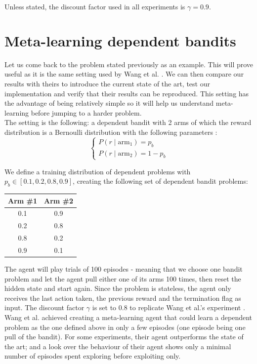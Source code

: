 Unless stated, the discount factor used in all experiments is $\gamma=0.9$. 


\section{Meta-learning dependent bandits}
Let us come back to the problem stated previously as an example. This will
prove useful as it is the same setting used by Wang et al. \cite{learningtorl}.
We can then compare our results with theirs to introduce the current state
of the art, test our implementation and verify that their results can 
be reproduced. This setting has the advantage of being relatively simple
so it will help us understand meta-learning before jumping to a harder problem.\\

The setting is the following: a dependent
bandit with 2 arms of which the reward distribution is a Bernoulli distribution
with the following parameters : 
$$ \begin{cases} P(r \mid \text{arm}_1) = p_b \\ 
P(r \mid \text{arm}_2) = 1 - p_b  \end{cases} $$

We define a training distribution of dependent problems with
$p_b \in [0.1, 0.2, 0.8, 0.9]$, creating the following set of dependent
bandit problems:
\begin{table}[H]
	\centering
	\begin{tabular}{c|c}
		Arm \#1 & Arm \#2 \\ \hline
		0.1 & 0.9 \\ \hline
		0.2 & 0.8 \\ \hline
		0.8 & 0.2 \\ \hline
		0.9 & 0.1
	\end{tabular}
\end{table}

The agent will play trials of 100 episodes - meaning that we choose one bandit
problem and let the agent pull either one of its arms 100 times, then reset
the hidden state and start again. Since the problem is stateless, the agent
only receives the last action taken, the previous reward and the termination
flag as input. The discount factor $\gamma$ is set to 0.8 to replicate 
Wang et al.'s experiment \cite{learningtorl}.\\

Wang et al. \cite{learningtorl} achieved creating a meta-learning
agent that could learn a dependent problem as the one defined above in only 
a few episodes (one episode being one pull of the bandit). For some experiments,
their agent outperforms the state of the art; and a look over the behaviour
of their agent shows only a minimal number of episodes spent exploring before
exploiting only.\\

